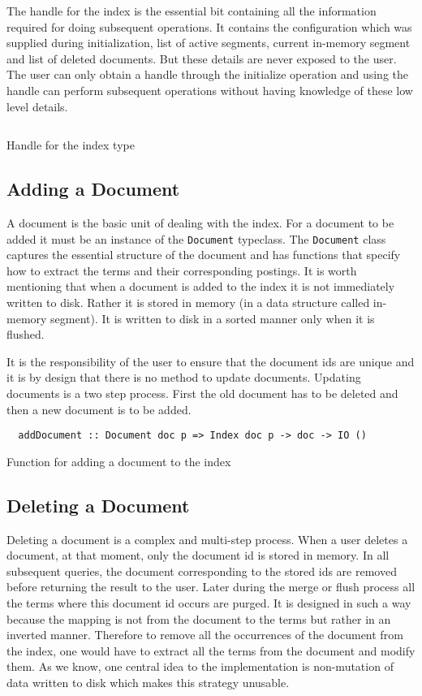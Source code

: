 The handle for the index is the essential bit containing all the information required for doing subsequent operations.
It contains the configuration which was supplied during initialization, list of active segments,
current in-memory segment and list of deleted documents.
But these details are never exposed to the user.
The user can only obtain a handle through the initialize operation and using the handle can perform subsequent operations without
having knowledge of these low level details.
\begin{listing}
\inputminted{haskell}{hs/hindex.hs}
\caption{Handle for the index type}
\end{listing}


\subsection{Adding a Document}
A document is the basic unit of dealing with the index. For a document to be added it must be an instance of the \texttt{Document} typeclass.
The \texttt{Document} class captures the essential structure of the document and has functions that specify how to extract the terms and their corresponding postings.
It is worth mentioning that when a document is added to the index it is not immediately written to disk.
Rather it is stored in memory (in a data structure called in-memory segment). It is written to disk in a sorted manner only when it is flushed.

It is the responsibility of the user to ensure that the document ids are unique and it is by design that there is no method to update documents.
Updating documents is a two step process. First the old document has to be deleted and then a new document is to be added.

\begin{listing}
\begin{verbatim}
  addDocument :: Document doc p => Index doc p -> doc -> IO ()
\end{verbatim}
\caption{Function for adding a document to the index}
\end{listing}

\subsection{Deleting a Document}
Deleting a document is a complex and multi-step process. When a user deletes a document, at that moment, only the document id is stored in memory.
In all subsequent queries, the document corresponding to the stored ids are removed before returning the result to the user.
Later during the merge or flush process all the terms where this document id occurs are purged.
It is designed in such a way because the mapping is not from the document to the terms but rather in an inverted manner.
Therefore to remove all the occurrences of the document from the index, one would have to extract all the terms from the document and modify them.
As we know, one central idea to the implementation is non-mutation of data written to disk which makes this strategy unusable.

